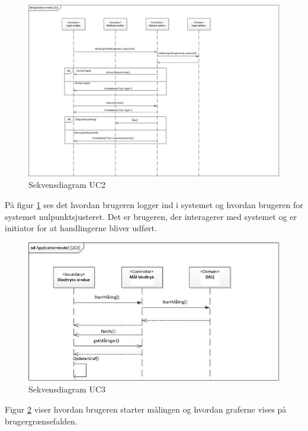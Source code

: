 \begin{figure}[H]
	\centering
	\includegraphics[width=1\textwidth]{Figurer/ISE/sdAppModelUC2}
	\caption{Sekvensdiagram UC2}
	\label{sd UC2}
\end{figure}

På figur \ref{sd UC2} ses det hvordan brugeren logger ind i systemet og hvordan brugeren for systemet nulpunktsjusteret. Det er brugeren, der interagerer med systemet og er initiator for at handlingerne bliver udført. 

\begin{figure}[H]
	\includegraphics[width=1\textwidth]{Figurer/ISE/sdAppModelUC3}
	\caption{Sekvensdiagram UC3}
	\label{sd UC3}
\end{figure}

Figur \ref{sd UC3} viser hvordan brugeren starter målingen og hvordan graferne vises på brugergrænsefalden.

